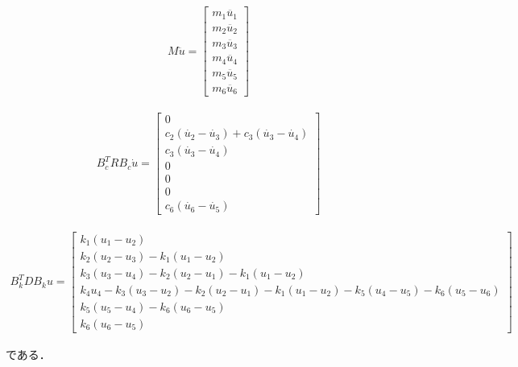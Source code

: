 \begin{eqnarray}
    M\ddot{u} =
    \left[\begin{matrix}
        m_1 \ddot{u_1} \\
        m_2 \ddot{u_2} \\
        m_3 \ddot{u_3} \\
        m_4 \ddot{u_4} \\
        m_5 \ddot{u_5} \\
        m_6 \ddot{u_6} 
    \end{matrix}\right]
\end{eqnarray}

\begin{eqnarray}
    B_c^T R B_c \dot{u} =
    \left[\begin{matrix}
        0 \\
        c_2 (\dot{u_2} - \dot{u_3}) + c_3 (\dot{u_3} - \dot{u_4}) \\
        c_3 (\dot{u_3} - \dot{u_4}) \\
        0 \\
        0 \\
        0 \\
        c_6 (\dot{u_6} - \dot{u_5}) 
    \end{matrix}\right]
\end{eqnarray}

\begin{eqnarray}
    B_k^T D B_k u =
    \left[\begin{matrix}
        k_1 (u_1 - u_2) \\
        k_2 (u_2 - u_3) - k_1 (u_1 - u_2) \\
        k_3 (u_3 - u_4) - k_2 (u_2 - u_1) - k_1 (u_1 - u_2) \\
        k_4 u_4 - k_3 (u_3 - u_2) - k_2 (u_2 - u_1) - k_1 (u_1 - u_2) - k_5 (u_4 - u_5) - k_6 (u_5 - u_6) \\
        k_5 (u_5 - u_4) - k_6 (u_6 - u_5) \\
        k_6 (u_6 - u_5) 
    \end{matrix}\right]
\end{eqnarray}

である．
